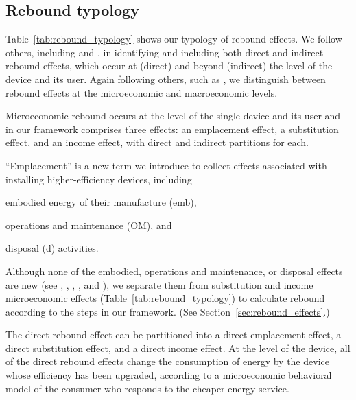 \documentclass[12pt]{article}\usepackage[]{graphicx}\usepackage[]{xcolor}
\begin{document}
\subsection{Rebound typology}
\label{sec:rebound_typology}



Table~\ref{tab:rebound_typology} shows our typology of rebound effects.
We follow others, including \citet{Jenkins2011} and \citet{Walnum2014}, 
in identifying and including both direct and indirect rebound effects, 
which occur at (direct) and beyond (indirect) 
the level of the device and its user.
Again following others, such as \citet{Gillingham2016}, 
we distinguish between rebound effects 
at the microeconomic and macroeconomic levels.

Microeconomic rebound occurs at the level 
of the single device and its user and
in our framework comprises three effects: 
an emplacement effect, 
a substitution effect, and
an income effect, 
with direct and indirect partitions for each.

``Emplacement'' is a new term we introduce 
to collect effects associated with installing 
higher-efficiency devices, 
including 
%
\begin{enumerate*}[label={(\roman*)}]
	
  \item embodied energy of their manufacture (emb), 
  
  \item operations and maintenance (OM), and
  
  \item disposal (d) activities.
    
\end{enumerate*}
%
Although none of the
embodied,
operations and maintenance, or
disposal effects are new
(see
\citet[footnote~5, p.~3]{Borenstein:2015aa}, 
\citet{Saunders:2021te}, 
\citet{Sorrell:2009aa}, 
\citet[footnote~37, p.~16]{Borenstein:2015aa}, and  
\citet{sorrell2020limits}),
we separate them from substitution and income
microeconomic effects 
(Table~\ref{tab:rebound_typology}) 
to calculate rebound according to the steps in our 
framework. 
(See Section~\ref{sec:rebound_effects}.)

The direct rebound effect can be partitioned into 
a direct emplacement effect, 
a direct substitution effect, and
a direct income effect. 
At the level of the device, 
all of the direct rebound effects change the consumption 
of energy
by the device whose efficiency has been upgraded,  
according to a microeconomic behavioral model of the consumer who
responds to the cheaper energy service.
\end{document}
